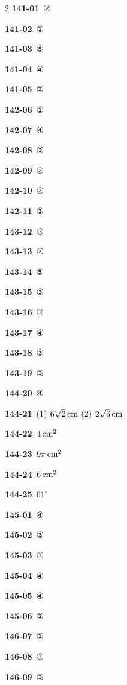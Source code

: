 \documentclass[10pt,a4paper]{article}
\begin{document}
\begin{multicols}{2}
\noindent\textbf{141-01}\ ②\par
\noindent\textbf{141-02}\ ①\par
\noindent\textbf{141-03}\ ⑤\par
\noindent\textbf{141-04}\ ④\par
\noindent\textbf{141-05}\ ②\par
\noindent\textbf{142-06}\ ①\par
\noindent\textbf{142-07}\ ④\par
\noindent\textbf{142-08}\ ③\par
\noindent\textbf{142-09}\ ②\par
\noindent\textbf{142-10}\ ②\par
\noindent\textbf{142-11}\ ③\par
\noindent\textbf{143-12}\ ③\par
\noindent\textbf{143-13}\ ②\par
\noindent\textbf{143-14}\ ⑤\par
\noindent\textbf{143-15}\ ③\par
\noindent\textbf{143-16}\ ③\par
\noindent\textbf{143-17}\ ④\par
\noindent\textbf{143-18}\ ③\par
\noindent\textbf{143-19}\ ③\par
\noindent\textbf{144-20}\ ④\par
\noindent\textbf{144-21}\ (1) $6\sqrt{2}\mkern3mu \mathrm{cm}$ (2) $2\sqrt{6}\mkern3mu \mathrm{cm}$\par
\noindent\textbf{144-22}\ $4\mkern3mu \mathrm{cm}^2$\par
\noindent\textbf{144-23}\ $9\pi\mkern3mu \mathrm{cm}^2$\par
\noindent\textbf{144-24}\ $6\mkern3mu \mathrm{cm}^2$\par
\noindent\textbf{144-25}\ $61^\circ$\par
\noindent\textbf{145-01}\ ④\par
\noindent\textbf{145-02}\ ③\par
\noindent\textbf{145-03}\ ①\par
\noindent\textbf{145-04}\ ④\par
\noindent\textbf{145-05}\ ④\par
\noindent\textbf{145-06}\ ②\par
\noindent\textbf{146-07}\ ①\par
\noindent\textbf{146-08}\ ①\par
\noindent\textbf{146-09}\ ③\par

\end{multicols}
\end{document}

